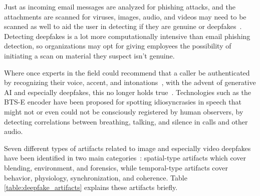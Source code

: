 Just as incoming email messages are analyzed for phishing attacks, and the attachments are scanned for viruses, images, audio, and videos may need to be scanned as well to aid the user in detecting if they are genuine or deepfakes~\citep{mirsky_Creation_Detection_Deepfakes_2021}. Detecting deepfakes is a lot more computationally intensive than email phishing detection, so organizations may opt for giving employees the possibility of initiating a scan on material they suspect isn’t genuine.



Where once experts in the field could recommend that a caller be authenticated by recognizing their voice, accent, and intonations~\citep{mitnick_The_Art_of_Deception_2003}, with the advent of generative AI and especially deepfakes, this no longer holds true~\citep{doan_BTSE_Audio_Deepfake_Detection_2023}. Technologies such as the BTS-E encoder have been proposed for spotting idiosyncrasies in speech that might not or even could not be consciously registered by human observers, by detecting correlations between breathing, talking, and silence in calls and other audio.

%
%
Seven different types of artifacts related to image and especially video deepfakes have been identified in two main categories~\citep{mirsky_Creation_Detection_Deepfakes_2021}: spatial-type artifacts which cover blending, environment, and forensics, while temporal-type artifacts cover behavior, physiology, synchronization, and coherence. Table \ref{table:deepfake_artifacts} explains these artifacts briefly.

